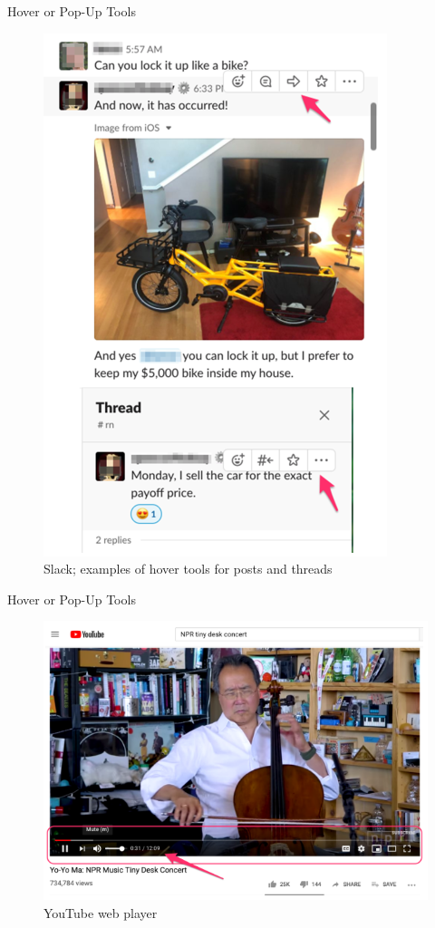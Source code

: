 \documentclass{beamer}
\begin{document}
\begin{frame}[t]{Hover or Pop-Up Tools}
	\begin{figure}[h]
		\centering
		\includegraphics[scale=0.6]{images/lec08-pic04.png}
		\caption{Slack; examples of hover tools for posts and threads}
	\end{figure}
\end{frame}	

\begin{frame}[t]{Hover or Pop-Up Tools}
	\begin{figure}[h]
		\centering
		\includegraphics[scale=0.6]{images/lec08-pic05.png}
		\caption{YouTube web player}
	\end{figure}
\end{frame}
\end{document}
